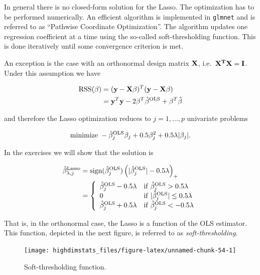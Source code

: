 \documentclass[
]{book}
\begin{document}
In general there is no closed-form solution for the Lasso. The optimization has to be performed numerically. An efficient algorithm is implemented in \texttt{glmnet} and is referred to as ``Pathwise Coordinate Optimization''. The algorithm updates one regression coefficient at a time using the so-called soft-thresholding function. This is done iteratively until some convergence criterion is met.

An exception is the case with an orthonormal design matrix \(\bf X\), i.e.~\(\bf X^T\bf X=\bf I\). Under this assumption we have

\begin{align*}
\textrm{RSS}(\beta)&=(\textbf{y}-\textbf{X}\beta)^T(\textbf{y}-\textbf{X}\beta)\\
&=\textbf{y}^T\textbf{y}-2\beta^T\hat\beta^{\rm OLS}+\beta^T\hat\beta
\end{align*}

and therefore the Lasso optimization reduces to \(j=1,\ldots,p\) univariate problems

\[\textrm{minimize}\; -\hat\beta_j^{\rm OLS}\beta_j+0.5\beta_j^2+0.5\lambda |\beta_j|.\]

In the exercises we will show that the solution is

\begin{align*}
\hat{\beta}_{\lambda,j}^{\textrm{Lasso}}&=\textrm{sign}(\hat{\beta}_j^{\rm OLS})\left(|\hat{\beta}_j^{\rm OLS}|-0.5\lambda\right)_{+}\\
&=\left\{\begin{array}{ll}
      \hat\beta^{\rm OLS}_j-0.5\lambda & {\rm if}\;\hat\beta^{\rm OLS}_j>0.5\lambda\\
      0 & {\rm if}\;|\hat\beta^{\rm OLS}_j|\leq 0.5\lambda\\
 \hat\beta^{\rm OLS}_j+0.5\lambda & {\rm if}\;\hat\beta^{\rm OLS}_j<-0.5\lambda
    \end{array}
  \right.
\end{align*}

That is, in the orthonormal case, the Lasso is a function of the OLS estimator. This function, depicted in the next figure, is referred to as \emph{soft-thresholding}.

\begin{figure}

{\centering \texttt{[image: highdimstats\_files/figure-latex/unnamed-chunk-54-1]} 

}

\caption{Soft-thresholding function.}\label{fig:unnamed-chunk-54}
\end{figure}
\end{document}
